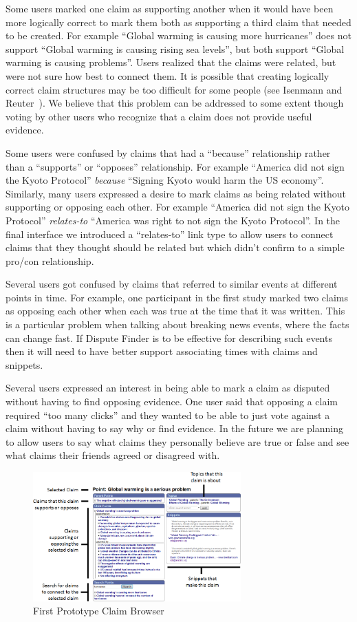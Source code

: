 \documentclass{www2010-submission}
\begin{document}
Some users marked one claim as supporting another when it would have been more logically correct to mark them both as supporting a third claim that needed to be created. For example ``Global warming is causing more hurricanes'' does not support ``Global warming is causing rising sea levels'', but both support ``Global warming is causing problems''. Users realized that the claims were related, but were not sure how best to connect them. It is possible that creating logically correct claim structures may be too difficult for some people (see Isenmann and Reuter~\cite{Isenmann1997}). We believe that this problem can be addressed to some extent though voting by other users who recognize that a claim does not provide useful evidence. 

Some users were confused by claims that had a ``because'' relationship rather than a ``supports'' or ``opposes'' relationship. For example ``America did not sign the Kyoto Protocol'' {\it because} ``Signing Kyoto would harm the US economy''. Similarly, many users expressed a desire to mark claims as being related without supporting or opposing each other. For example ``America did not sign the Kyoto Protocol'' {\it  relates-to} ``America was right to not sign the Kyoto Protocol''. In the final interface we introduced a ``relates-to'' link type to allow users to connect claims that they thought should be related but which didn't confirm to a simple pro/con relationship. 

Several users got confused by claims that referred to similar events at different points in time. 
For example, one participant in the first study marked two claims as opposing each other when each was true at the time that it was written. This is a particular problem when talking about breaking news events, where the facts can change fast. If Dispute Finder is to be effective for describing such events then it will need to have better support associating times with claims and snippets.

Several users expressed an interest in being able to mark a claim as disputed without having to find opposing evidence. One user said that opposing a claim required ``too many clicks'' and they wanted to be able to just vote against a claim without having to say why or find evidence. In the future we are planning to allow users to say what claims they personally believe are true or false and see what claims their friends agreed or disagreed with.

\begin{figure}[tb]
	\includegraphics[width=8cm]{../screenshots/oldpoint_diagram.png}
	\caption{First Prototype Claim Browser}
	\label{oldbrowser}
\end{figure}
\end{document}
